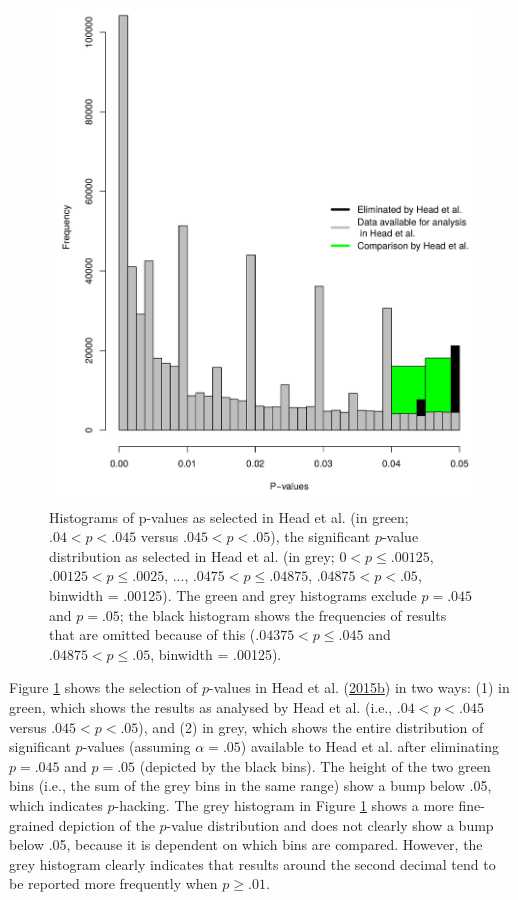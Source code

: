 \documentclass[a5paper]{book}
\begin{document}
\begin{figure}

{\centering \includegraphics[width=0.8\linewidth]{assets/figures/head-fig1} 

}

\caption{Histograms of p-values as selected in Head et al. (in green; $.04 < p < .045$ versus $.045 < p < .05$), the significant $p$-value distribution as selected in Head et al. (in grey; $0<p\leq.00125$, $.00125<p\leq.0025$, ..., $.0475<p\leq.04875$, $.04875<p<.05$, binwidth = .00125). The green and grey histograms exclude $p=.045$ and $p=.05$; the black histogram shows the frequencies of results that are omitted because of this ($.04375<p\leq.045$ and $.04875<p\leq.05$, binwidth = .00125).}\label{fig:head-hist}
\end{figure}

Figure \ref{fig:head-hist} shows the selection of \(p\)-values in Head
et al.
(\protect\hyperlink{ref-doi:10.1371ux2fjournal.pbio.1002106}{2015}\protect\hyperlink{ref-doi:10.1371ux2fjournal.pbio.1002106}{b})
in two ways: (1) in green, which shows the results as analysed by Head
et al. (i.e., \(.04<p<.045\) versus \(.045<p<.05\)), and (2) in grey,
which shows the entire distribution of significant \(p\)-values
(assuming \(\alpha=.05\)) available to Head et al. after eliminating
\(p=.045\) and \(p=.05\) (depicted by the black bins). The height of the
two green bins (i.e., the sum of the grey bins in the same range) show a
bump below .05, which indicates \(p\)-hacking. The grey histogram in
Figure \ref{fig:head-hist} shows a more fine-grained depiction of the
\(p\)-value distribution and does not clearly show a bump below .05,
because it is dependent on which bins are compared. However, the grey
histogram clearly indicates that results around the second decimal tend
to be reported more frequently when \(p\geq.01\).
\end{document}
